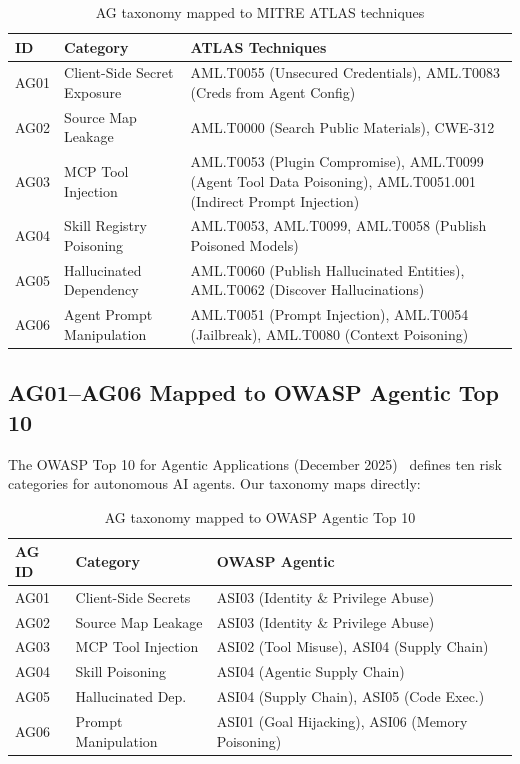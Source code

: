 \documentclass[11pt,twocolumn]{article}
\begin{document}
\begin{table}[H]
\centering
\caption{AG taxonomy mapped to MITRE ATLAS techniques}
\label{tab:atlas-mapping}
\scriptsize
\begin{tabular}{@{}lp{2cm}p{3.5cm}@{}}
\toprule
\textbf{ID} & \textbf{Category} & \textbf{ATLAS Techniques} \\
\midrule
AG01 & Client-Side Secret Exposure & AML.T0055 (Unsecured Credentials), AML.T0083 (Creds from Agent Config) \\
AG02 & Source Map Leakage & AML.T0000 (Search Public Materials), CWE-312 \\
AG03 & MCP Tool Injection & AML.T0053 (Plugin Compromise), AML.T0099 (Agent Tool Data Poisoning), AML.T0051.001 (Indirect Prompt Injection) \\
AG04 & Skill Registry Poisoning & AML.T0053, AML.T0099, AML.T0058 (Publish Poisoned Models) \\
AG05 & Hallucinated Dependency & AML.T0060 (Publish Hallucinated Entities), AML.T0062 (Discover Hallucinations) \\
AG06 & Agent Prompt Manipulation & AML.T0051 (Prompt Injection), AML.T0054 (Jailbreak), AML.T0080 (Context Poisoning) \\
\bottomrule
\end{tabular}
\end{table}

\subsection{AG01--AG06 Mapped to OWASP Agentic Top 10}

The OWASP Top 10 for Agentic Applications (December 2025)~\cite{owaspagentic2026} defines ten risk categories for autonomous AI agents. Our taxonomy maps directly:

\begin{table}[H]
\centering
\caption{AG taxonomy mapped to OWASP Agentic Top 10}
\label{tab:owasp-agentic}
\scriptsize
\begin{tabular}{@{}lll@{}}
\toprule
\textbf{AG ID} & \textbf{Category} & \textbf{OWASP Agentic} \\
\midrule
AG01 & Client-Side Secrets & ASI03 (Identity \& Privilege Abuse) \\
AG02 & Source Map Leakage & ASI03 (Identity \& Privilege Abuse) \\
AG03 & MCP Tool Injection & ASI02 (Tool Misuse), ASI04 (Supply Chain) \\
AG04 & Skill Poisoning & ASI04 (Agentic Supply Chain) \\
AG05 & Hallucinated Dep. & ASI04 (Supply Chain), ASI05 (Code Exec.) \\
AG06 & Prompt Manipulation & ASI01 (Goal Hijacking), ASI06 (Memory Poisoning) \\
\bottomrule
\end{tabular}
\end{table}
\end{document}
